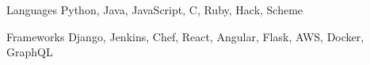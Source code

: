 
\begin{cvskills}
  \cvskill
  {Languages} %
  {Python, Java, JavaScript, C, Ruby, Hack, Scheme} %

  \cvskill
  {Frameworks} %
  {Django, Jenkins, Chef, React, Angular, Flask, AWS, Docker, GraphQL} %
\end{cvskills}
